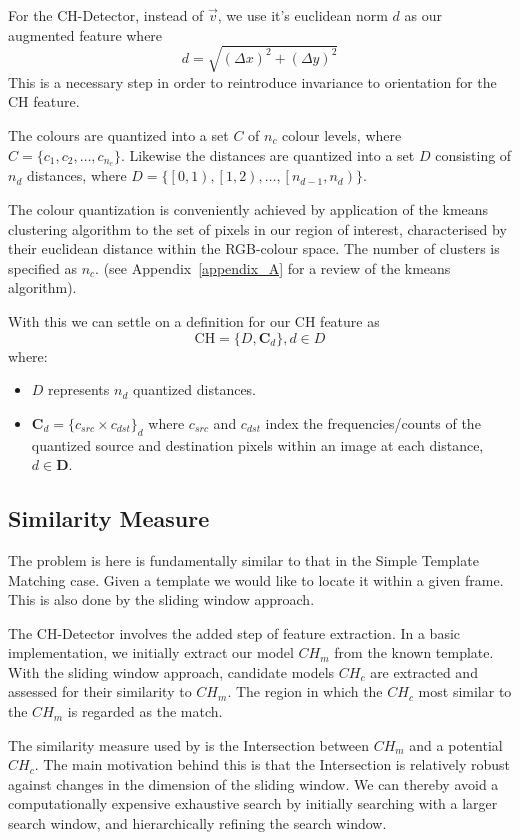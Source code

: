 For the CH-Detector, instead of $\vec{v}$, we use it's euclidean norm $d$ as our
augmented feature where 
$$d = \sqrt{{(\Delta{x})}^2 + {(\Delta{y})}^2}$$ 
This is a necessary step in order to reintroduce invariance to orientation for
the CH feature. 

The colours are quantized into a set $C$ of $n_c$ colour levels, where 
$C = \{c_1,c_2,\dots,c_{n_c}\}$. Likewise the distances are quantized into
a set $D$ consisting of $n_d$ distances, where $D = \{\left[ 0,1
\right),\left[ 1,2\right), \dots , \left[ n_{d-1},n_{d} \right)\}$.

The colour quantization is conveniently achieved by application of the kmeans clustering
algorithm to the set of pixels in our region of interest, characterised by their
euclidean distance within the RGB-colour space. The number of clusters is
specified as $n_c$. (see Appendix~\ref{appendix_A} for a review of the kmeans
algorithm). 

With this we can settle on a definition for our CH feature as
$$\text{CH} = \{D,\mathbf{C}_d\}, d\in{D}$$
where:
\begin{itemize}
    \item $D$ represents $n_d$ quantized distances.
    \item $\mathbf{C}_d = \{{c_{src} \times c_{dst}\}_d}$ where $c_{src}$ and
        $c_{dst}$ index the frequencies/counts of the quantized source and destination
        pixels within an image at each distance, $d \in
        \mathbf{D}$.
\end{itemize}

\subsection{Similarity Measure}\label{theoretical_framework_intersection}
The problem is here is fundamentally similar to that in the Simple Template
Matching case. Given a template we would like to locate it within a given frame.
This is also done by the sliding window approach.

The CH-Detector involves the added step of feature extraction. In a basic
implementation, we initially extract our model $CH_m$ from the known template.
With the sliding window approach, candidate models $CH_c$ are extracted and
assessed for their similarity to $CH_m$. The region in which the $CH_c$ most
similar to the $CH_m$ is regarded as the match. 

The similarity measure used by \cite{Chang1999} is the 
Intersection between $CH_m$ and a potential $CH_c$. The main motivation behind
this is that the Intersection is relatively robust against changes in the
dimension of the sliding window.
We can thereby avoid a computationally expensive exhaustive search by initially
searching with a larger search window, and hierarchically refining the search
window.

